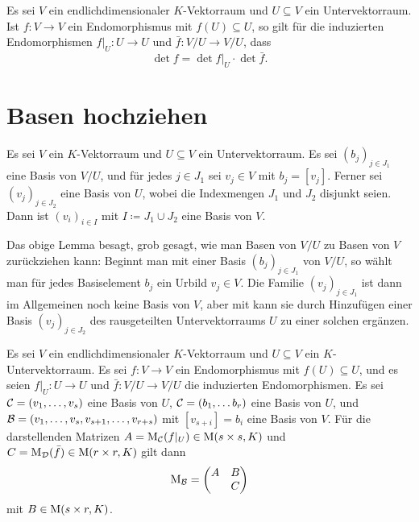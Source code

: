 \documentclass[a4paper,10pt]{article}
\begin{document}
\begin{corollary}
  Es sei $V$ ein endlichdimensionaler $K$-Vektorraum und $U \subseteq V$ ein Untervektorraum.
  Ist $f \colon V \to V$ ein Endomorphismus mit $f(U) \subseteq U$, so gilt für die induzierten Endomorphismen $f|_U \colon U \to U$ und $\bar{f} \colon V/U \to V/U$, dass
  \[
    \det f = \det f|_U \cdot \det \bar{f}.
  \]
\end{corollary}





\section{Basen hochziehen}

\begin{lemma}
  Es sei $V$ ein $K$-Vektorraum und $U \subseteq V$ ein Untervektorraum.
  Es sei $(b_j)_{j \in J_1}$ eine Basis von $V/U$, und für jedes $j \in J_1$ sei $v_j \in V$ mit $b_j = [v_j]$.
  Ferner sei $(v_j)_{j \in J_2}$ eine Basis von $U$, wobei die Indexmengen $J_1$ und $J_2$ disjunkt seien.
  Dann ist $(v_i)_{i \in I}$ mit $I \coloneqq J_1 \cup J_2$ eine Basis von $V$.
\end{lemma}

\begin{remark}
  Das obige Lemma besagt, grob gesagt, wie man Basen von $V/U$ zu Basen von $V$ zurückziehen kann:
  Beginnt man mit einer Basis $(b_j)_{j \in J_1}$ von $V/U$, so wählt man für jedes Basiselement $b_j$ ein Urbild $v_j \in V$.
  Die Familie $(v_j)_{j \in J_1}$ ist dann im Allgemeinen noch keine Basis von $V$, aber mit kann sie durch Hinzufügen einer Basis $(v_j)_{j \in J_2}$ des rausgeteilten Untervektorraums $U$ zu einer solchen ergänzen.
\end{remark}

\begin{corollary}
  Es sei $V$ ein endlichdimensionaler $K$-Vektorraum und $U \subseteq V$ ein $K$-Untervektorraum.
  Es sei $f \colon V \to V$ ein Endomorphismus mit $f(U) \subseteq U$, und es seien $f|_U \colon U \to U$ und $\bar{f} \colon V/U \to V/U$ die induzierten Endomorphismen.
  Es sei $\mathcal{C} = (v_1, \dotsc, v_s)$ eine Basis von $U$, $\mathcal{C} = (b_1, \dotsc b_r)$ eine Basis von $U$, und $\mathcal{B} = (v_1, \dotsc, v_s, v_{s+1}, \dotsc, v_{r+s})$ mit $[v_{s+i}] = b_i$ eine Basis von $V$.
  Für die darstellenden Matrizen $A = \operatorname{M}_{\mathcal{C}}(f|_U) \in \operatorname{M}(s \times s, K)$ und $C = \operatorname{M}_{\mathcal{D}}(\bar{f}) \in \operatorname{M}(r \times r, K)$ gilt dann
  \[
    \operatorname{M}_{\mathcal{B}}
    =
    \begin{pmatrix}
      A & B \\
        & C
    \end{pmatrix}
  \]
  mit $B \in \operatorname{M}(s \times r, K)$.
\end{corollary}
\end{document}
